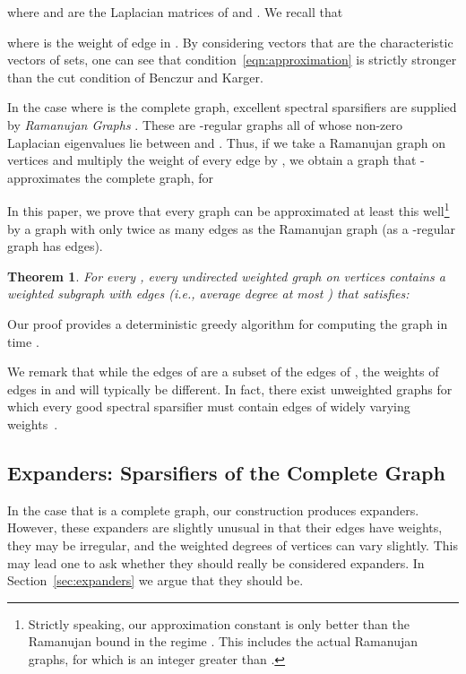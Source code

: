\documentclass[12pt]{article}
\newtheorem{theorem}{Theorem}[section]
\begin{document}
where  and  are the Laplacian matrices of  and .
We recall that

where  is the weight of edge  in .
By considering vectors  that are the characteristic vectors of sets,
  one can see that condition~\eqref{eqn:approximation}
  is strictly stronger than the cut
  condition of Benczur and Karger.

In the case where  is the complete graph, excellent spectral
  sparsifiers are supplied
  by \textit{Ramanujan Graphs} \cite{LPS,Margulis}.
These are -regular graphs  
  all of whose non-zero Laplacian eigenvalues lie between
   and .
Thus, if we take a Ramanujan graph on  vertices and
  multiply the weight of every edge by
  , we obtain a graph
  that
   -approximates
  the complete graph, for 

  
In this paper, we prove that
  every graph can be approximated at least this 
  well\footnote{
Strictly speaking, our approximation constant is only better than the Ramanujan
  bound  in the regime .
  This includes the actual Ramanujan graphs, for which  is an integer greater
  than .}
     by a graph with only twice as many edges 
  as the Ramanujan graph
  (as a -regular graph has  edges).
\begin{theorem}\label{thm:mainthm}
For every , 
  every undirected weighted graph  on  vertices
  contains a weighted subgraph  with 
  edges (i.e., average degree at most ) that satisfies:

\end{theorem}
Our proof provides
  a deterministic greedy algorithm for computing the graph  in 
  time   .

We remark that while the edges of  are a subset of the edges of ,
  the weights of edges in  and  will typically be different.
In fact, there exist unweighted graphs  for which every good spectral 
  sparsifier  must contain edges of 
  widely varying weights~\cite{SpielmanTengSparsifier}.

\subsection{Expanders: Sparsifiers of the Complete Graph}
In the case that  is a complete graph, 
  our construction produces expanders.
However, these expanders are slightly unusual in that their edges have weights,
  they may be irregular, and the weighted degrees of vertices can vary slightly.
This may lead one to ask whether they should really be considered expanders.
In Section~\ref{sec:expanders} we argue that they should be.
\end{document}
